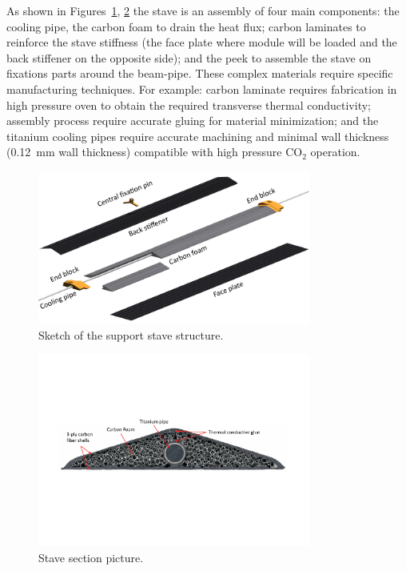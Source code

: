 As shown in Figures~\ref{fig:StaveConcept}, \ref{fig:StaveCrossSection} the stave is an assembly of four main components: the cooling pipe, the carbon foam to drain the heat flux; carbon laminates to reinforce the stave stiffness (the face plate where module will be loaded and the back stiffener on the opposite side); and the peek to assemble the stave on fixations parts around the beam-pipe. These complex materials require specific manufacturing techniques. For example: carbon laminate requires fabrication in high pressure oven to obtain the required transverse thermal conductivity; assembly process require accurate gluing for material minimization; and the titanium cooling pipes require accurate machining and minimal wall thickness (\SI{0.12}{\milli\meter} wall thickness) compatible with high pressure  CO$_2$ operation. 

\begin{figure}
\begin{center}
 \includegraphics[width=0.8\textwidth]{Images/IBL_Paper/chapter05_Staves/BareStaveStructure_text.pdf}
\caption{Sketch of the support stave structure.}
\label{fig:StaveConcept}
\end{center}
\end{figure}

\begin{figure}
\begin{center}
 \includegraphics[width=0.8\textwidth]{Images/IBL_Paper/chapter05_Staves/Stave_section_WBG.pdf}
\caption{Stave section picture.}
\label{fig:StaveCrossSection}
\end{center}
\end{figure}

